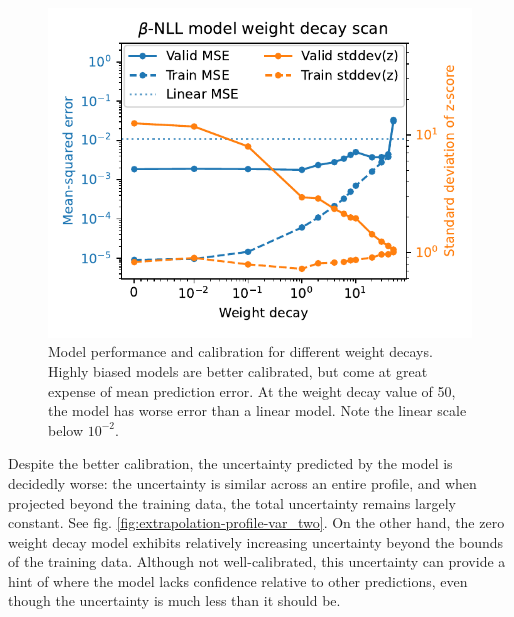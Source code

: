 
%
\begin{figure}
	\centering
	\includegraphics[width=\textwidth]{figures/beta-NLL_wd_model_performance.pdf}
	\caption[size=12]{\label{fig:beta-NLL_wd_model_performance}Model performance and calibration for different weight decays. Highly biased models are better calibrated, but come at great expense of mean prediction error. At the weight decay value of 50, the model has worse error than a linear model. Note the linear scale below $10^{-2}$.}
\end{figure}

Despite the better calibration, the uncertainty predicted by the model is decidedly worse: the uncertainty is similar across an entire profile, and when projected beyond the training data, the total uncertainty remains largely constant. See fig. \ref{fig:extrapolation-profile-var_two}. On the other hand, the zero weight decay model exhibits relatively increasing uncertainty beyond the bounds of the training data. Although not well-calibrated, this uncertainty can provide a hint of where the model lacks confidence relative to other predictions, even though the uncertainty is much less than it should be.


